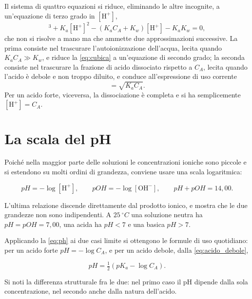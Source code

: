 Il sistema di quattro equazioni si riduce, eliminando le altre incognite, a un'equazione di terzo grado in $[\mathrm{H^+}]$,
\begin{equation}
    [\mathrm{H^+}]^3 + K_a[\mathrm{H^+}]^2 - (K_aC_A + K_w)[\mathrm{H^+}] - K_aK_w = 0 ,
    \label{eq:cubica}
\end{equation}
che non si risolve a mano ma che ammette due approssimazioni successive.
La prima consiste nel trascurare l'autoionizzazione dell'acqua, lecita quando $K_aC_A \gg K_w$, e riduce la \eqref{eq:cubica} a un'equazione di secondo grado; la seconda consiste nel trascurare la frazione di acido dissociato rispetto a $C_A$, lecita quando l'acido è debole e non troppo diluito, e conduce all'espressione di uso corrente
\begin{equation}
    [\mathrm{H^+}] = \sqrt{K_a C_A} .
    \label{eq:acido_debole}
\end{equation}
Per un acido forte, viceversa, la dissociazione è completa e si ha semplicemente $[\mathrm{H^+}] = C_A$.
 
\section{La scala del pH}
 
Poiché nella maggior parte delle soluzioni le concentrazioni ioniche sono piccole e si estendono su molti ordini di grandezza, conviene usare una scala logaritmica:

\begin{equation}
    pH = -\log[\mathrm{H^+}] ,
    \qquad
    pOH = -\log[\mathrm{OH^-}] ,
    \qquad
    pH + pOH = 14{,}00 .
    \label{eq:ph}
\end{equation}

L'ultima relazione discende direttamente dal prodotto ionico, e mostra che le due grandezze non sono indipendenti.
A $25 \ ^\circ C$ una soluzione neutra ha $pH = pOH = 7,00$, una acida ha $pH < 7$ e una basica $pH > 7$.
 
Applicando la \eqref{eq:ph} ai due casi limite si ottengono le formule di uso quotidiano: per un acido forte $pH = -\log C_A$, e per un acido debole, dalla \eqref{eq:acido_debole},

\begin{equation}
    pH = \tfrac{1}{2}\left(pK_a - \log C_A\right) .
    \label{eq:ph_debole}
\end{equation}

Si noti la differenza strutturale fra le due: nel primo caso il pH dipende dalla sola concentrazione, nel secondo anche dalla natura dell'acido.\\

